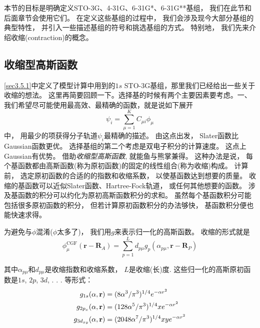 本节的目标是明确定义STO-3G、4-31G、6-31G*、6-31G**基组，
我们在此节和后面章节会使用它们。
在定义这些基组的过程中，
我们会涉及现今大部分基组的典型特性，
并引入一些描述基组的符号和挑选基组的方式。
特别地，
我们先来介绍收缩(contraction)的概念。

\subsection{收缩型高斯函数}
\autoref{sec3.5.1}中定义了模型计算中用到的$1s$ STO-3G基组，那里我们已经给出一些关于收缩的想法。
这里再简要回顾一下。选择基的时候有两个主要因素要考虑。一、我们希望尽可能使用最高效、最精确的函数，就是说如下展开
\begin{equation}
	\psi_i=\sum_{\mu=1}^{K}C_{\mu i}\phi_\mu
\end{equation}
中，
用最少的项获得分子轨道$\psi_i$最精确的描述。
由这点出发，
Slater函数比Gaussian函数更优。
选择基组的第二个考虑是双电子积分的计算速度。
这点上Gaussian有优势。
借助\emph{收缩型高斯函数}, 
就能鱼与熊掌兼得。
这种办法是说，
每个基函数都由高斯函数(称为原初函数)的固定的线性组合(称为收缩)构成。
计算前，
选定原初函数的合适的的指数和收缩系数，
以使基函数达到想要的质量。
收缩的基函数可以近似Slater函数、Hartree-Fock轨道，
或任何其他想要的函数。
涉及基函数的积分可以约化为原初高斯函数积分的求和。
虽然每个基函数积分可能包括很多原初函数的积分，
但若计算原初函数积分的办法够快，
基函数积分便也能快速求得。


为避免与$\phi$混淆($\phi$太多了)，
我们用$g$来表示归一化的高斯函数。
收缩的形式就是
\begin{equation}
	\phi^\mathrm{CGF}_\mu(\mathbf{r-R}_A)=\sum_{p=1}^{L}d_{p\mu}g_p(\alpha_{p\mu},\mathbf{r-R}_P)
	\label{3.283}
\end{equation}

其中$\alpha_{p\mu}$和$d_{p\mu}$是收缩指数和收缩系数，
$L$是收缩(长)度. 
这些归一化的高斯原初函数是$1s$, 
$2p$, 
$3d$, 
.
.
.
等形式：
\begin{align}
	g_{1s}(\alpha,\mathbf{r})      & = (8\alpha^3/\pi^3)^{1/4}       e^{-\alpha r^2}\\
	g_{2p_x}(\alpha,\mathbf{r})    & = (128\alpha^5/\pi^3)^{1/4}  x  e^{-\alpha r^2}\\
	g_{3d_{xy}}(\alpha,\mathbf{r}) & = (2048\alpha^7/\pi^3)^{1/4} xy e^{-\alpha r^2}
\end{align}

